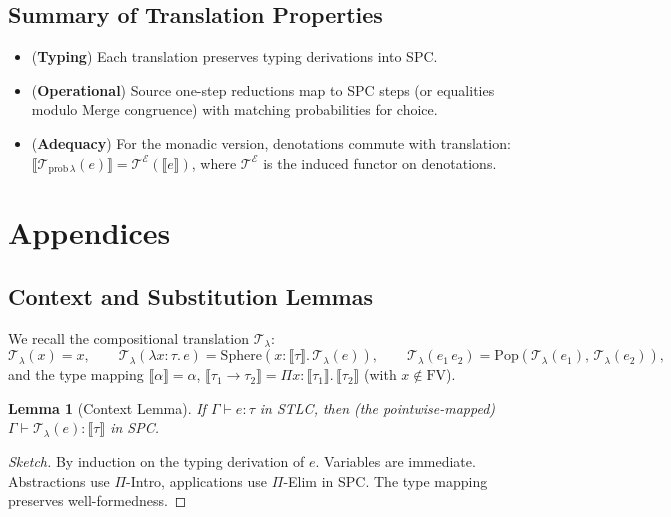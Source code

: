 \documentclass{article}
\newtheorem{lemma}[theorem]{Lemma}
\begin{document}
\subsection{Summary of Translation Properties}

\begin{itemize}
\item (\textbf{Typing}) Each translation preserves typing derivations into SPC.
\item (\textbf{Operational}) Source one-step reductions map to SPC steps
      (or equalities modulo Merge congruence) with matching probabilities for choice.
\item (\textbf{Adequacy}) For the monadic version, denotations commute with translation:
      $\llbracket \mathcal{T}_{\mathrm{prob}\,\lambda}(e)\rrbracket
      = \mathcal{T}^\mathcal{E}(\llbracket e \rrbracket)$, where
      $\mathcal{T}^\mathcal{E}$ is the induced functor on denotations.
\end{itemize}

\appendix

\section{Appendices}

\subsection{Context and Substitution Lemmas}

We recall the compositional translation $\mathcal{T}_\lambda$:
\[
\mathcal{T}_\lambda(x)=x,\qquad
\mathcal{T}_\lambda(\lambda x{:}\tau.\,e)=\mathrm{Sphere}(x{:}\llbracket\tau\rrbracket.\,\mathcal{T}_\lambda(e)),\qquad
\mathcal{T}_\lambda(e_1\,e_2)=\mathrm{Pop}(\mathcal{T}_\lambda(e_1),\,\mathcal{T}_\lambda(e_2)),
\]
and the type mapping $\llbracket\alpha\rrbracket=\alpha$, $\llbracket \tau_1\to\tau_2\rrbracket=\Pi x{:}\llbracket\tau_1\rrbracket.\,\llbracket\tau_2\rrbracket$ (with $x\notin \mathrm{FV}$).

\begin{lemma}[Context Lemma]
If $\Gamma \vdash e:\tau$ in STLC, then (the pointwise-mapped) $\Gamma \vdash \mathcal{T}_\lambda(e):\llbracket\tau\rrbracket$ in SPC.
\end{lemma}

\begin{proof}[Sketch]
By induction on the typing derivation of $e$. Variables are immediate. 
Abstractions use $\Pi$-Intro, applications use $\Pi$-Elim in SPC. The type mapping preserves well-formedness.
\end{proof}
\end{document}
